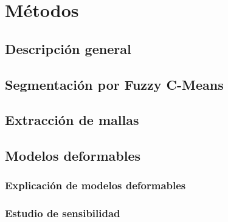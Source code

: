 \chapter{Métodos}
\section{Descripción general}
\section{Segmentación por Fuzzy C-Means}

\section{Extracción de mallas}
\section{Modelos deformables}
\subsection{Explicación de modelos deformables}
\subsection{Estudio de sensibilidad}